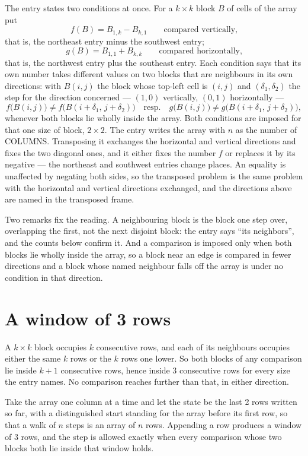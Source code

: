 \documentclass[11pt,a4paper]{article}
\theoremstyle{plain}
\theoremstyle{definition}
\begin{document}
The entry states two conditions at once. For a $k\times k$ block $B$ of
cells of the array put
\[
f(B)=B_{1,k}-B_{k,1}\qquad\text{compared vertically,}
\]
that is, the northeast entry minus the southwest entry;
\[
g(B)=B_{1,1}+B_{k,k}\qquad\text{compared horizontally,}
\]
that is, the northwest entry plus the southeast entry.
Each condition says that its own number takes different values on two blocks that are
neighbours in its own directions: with $B(i,j)$ the block whose top-left cell is $(i,j)$ and
$(\delta_1,\delta_2)$ the step for the direction concerned --- $(1,0)$ vertically, $(0,1)$ horizontally ---
\[
f\bigl(B(i,j)\bigr)\neq f\bigl(B(i+\delta_1,\,j+\delta_2)\bigr)
\quad\text{resp.}\quad
g\bigl(B(i,j)\bigr)\neq g\bigl(B(i+\delta_1,\,j+\delta_2)\bigr),
\]
whenever both blocks lie wholly inside the array. Both conditions are imposed for that one size of block,
$2\times2$. The entry writes the array with $n$ as the number of COLUMNS. Transposing
it exchanges the horizontal and vertical directions and fixes the two diagonal ones, and it
either fixes the number $f$ or replaces it by its negative --- the northeast and southwest
entries change places. An equality is unaffected by negating both sides, so the transposed
problem is the same problem with the horizontal and vertical directions exchanged, and the
directions above are named in the transposed frame.

Two remarks fix the reading. A neighbouring block is the block one step over, overlapping the
first, not the next disjoint block: the entry says ``its neighbors'', and the counts below
confirm it. And a comparison is imposed only when both blocks lie wholly inside the array, so a
block near an edge is compared in fewer directions and a block whose named neighbour falls off
the array is under no condition in that direction.

\section{A window of 3 rows}

A $k\times k$ block occupies $k$ consecutive rows, and each of its neighbours occupies either
the same $k$ rows or the $k$ rows one lower. So both blocks of any comparison lie inside $k+1$
consecutive rows, hence inside $3$ consecutive rows for every size the entry names. No
comparison reaches further than that, in either direction.

Take the array one column at a time and let the state be the last 2 rows written so far, with a
distinguished start standing for the array before its first row, so that a walk of $n$ steps is
an array of $n$ rows. Appending a row produces a window of $3$ rows, and the step is
allowed exactly when every comparison whose two blocks both lie inside that window holds.
\end{document}
